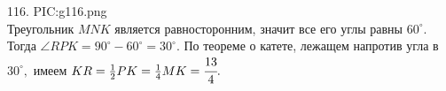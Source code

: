 116. {{PIC:g116.png}}\\
Треугольник $MNK$ является равносторонним, значит все его углы равны $60^\circ.$ Тогда $\angle RPK=90^\circ-60^\circ=30^\circ.$ По теореме о катете, лежащем напротив угла в $30^\circ,$ имеем $KR=\frac{1}{2}PK=\frac{1}{4}MK=\cfrac{13}{4}.$\\
